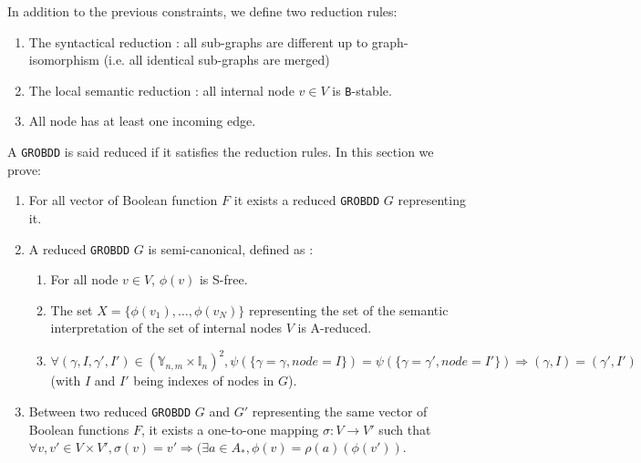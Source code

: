 \documentclass[a4paper,10pt]{article}
\newcommand{\Y}{\mathbb{Y}}
\newcommand{\I}{\mathbb{I}}
\newcommand{\GroBdd}{\texttt{GROBDD}}
\begin{document}
In addition to the previous constraints, we define two reduction rules:\begin{enumerate}
\item The syntactical reduction : all sub-graphs are different up to graph-isomorphism (i.e. all identical sub-graphs are merged)
\item The local semantic reduction : all internal node $v\in V$ is \texttt{B}-stable.
\item All node has at least one incoming edge.
\end{enumerate}
A \GroBdd{} is said reduced if it satisfies the reduction rules.
In this section we prove:\begin{enumerate}
\item For all vector of Boolean function $F$ it exists a reduced \GroBdd{} $G$ representing it.
\item A reduced \GroBdd{} $G$ is semi-canonical, defined as :\begin{enumerate}
\item For all node $v\in V$, $\phi(v)$ is S-free.
\item The set $X = \{\phi(v_1), \dots, \phi(v_N)\}$ representing the set of the semantic interpretation of the set of internal nodes $V$ is A-reduced.
\item $\forall (\gamma, I, \gamma', I') \in (\Y_{n, m} \times \I_n)^2, \psi(\{\gamma = \gamma, node = I\}) = \psi(\{\gamma = \gamma', node = I'\}) \Rightarrow (\gamma, I) = (\gamma', I')$ (with $I$ and $I'$ being indexes of nodes in $G$).
\end{enumerate}
\item Between two reduced \GroBdd{} $G$ and $G'$ representing the same vector of Boolean functions $F$, it exists a one-to-one mapping $\sigma : V \longrightarrow V'$ such that $\forall v, v' \in V \times V', \sigma(v) = v' \Rightarrow (\exists a \in A_{*}, \phi(v) = \rho(a)(\phi(v'))$.
\end{enumerate}
\end{document}
